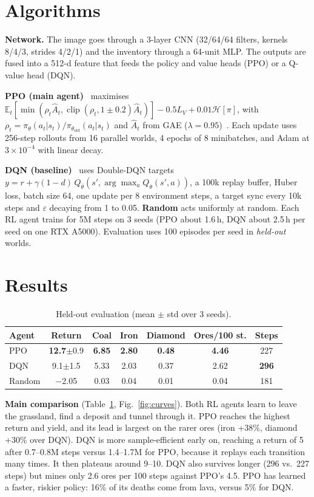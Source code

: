 \documentclass[conference,10pt]{IEEEtran}
\begin{document}
\section{Algorithms}
\textbf{Network.} The image goes through a 3-layer CNN (32/64/64 filters, kernels 8/4/3, strides 4/2/1) and the inventory through a 64-unit MLP. The outputs are fused into a 512-d feature that feeds the policy and value heads (PPO) or a Q-value head (DQN).

\textbf{PPO (main agent)}~\cite{ppo} maximises
$\mathbb{E}_t[\min(\rho_t\hat A_t,\operatorname{clip}(\rho_t,1{\pm}0.2)\hat A_t)] - 0.5L_V + 0.01\mathcal{H}[\pi]$,
with $\rho_t=\pi_\theta(a_t|s_t)/\pi_{\theta_\text{old}}(a_t|s_t)$ and $\hat A_t$ from GAE ($\lambda{=}0.95$)~\cite{gae}. Each update uses 256-step rollouts from 16 parallel worlds, 4 epochs of 8 minibatches, and Adam at $3{\times}10^{-4}$ with linear decay.

\textbf{DQN (baseline)}~\cite{dqn} uses Double-DQN targets~\cite{ddqn} $y=r+\gamma(1{-}d)\,Q_{\bar\theta}(s',\arg\max_a Q_\theta(s',a))$, a 100k replay buffer, Huber loss, batch size 64, one update per 8 environment steps, a target sync every 10k steps and $\varepsilon$ decaying from 1 to 0.05. \textbf{Random} acts uniformly at random. Each RL agent trains for 5M steps on 3 seeds (PPO about 1.6\,h, DQN about 2.5\,h per seed on one RTX A5000). Evaluation uses 100 episodes per seed in \emph{held-out} worlds.

\section{Results}
\begin{table}[t]
\centering\footnotesize
\caption{Held-out evaluation (mean $\pm$ std over 3 seeds).}
\label{tab:main}
\setlength{\tabcolsep}{3.2pt}
\begin{tabular}{lcccccc}
\toprule
Agent & Return & Coal & Iron & Diamond & Ores/100 st. & Steps \\
\midrule
PPO    & \textbf{12.7}$\pm$0.9 & \textbf{6.85} & \textbf{2.80} & \textbf{0.48} & \textbf{4.46} & 227 \\
DQN    & 9.1$\pm$1.5 & 5.33 & 2.03 & 0.37 & 2.62 & \textbf{296} \\
Random & $-$2.05 & 0.03 & 0.04 & 0.01 & 0.04 & 181 \\
\bottomrule
\end{tabular}
\end{table}

\textbf{Main comparison} (Table~\ref{tab:main}, Fig.~\ref{fig:curves}). Both RL agents learn to leave the grassland, find a deposit and tunnel through it. PPO reaches the highest return and yield, and its lead is largest on the rarer ores (iron +38\%, diamond +30\% over DQN). DQN is more sample-efficient early on, reaching a return of 5 after 0.7--0.8M steps versus 1.4--1.7M for PPO, because it replays each transition many times. It then plateaus around 9--10. DQN also survives longer (296 vs.\ 227 steps) but mines only 2.6 ores per 100 steps against PPO's 4.5. PPO has learned a faster, riskier policy: 16\% of its deaths come from lava, versus 5\% for DQN.
\end{document}
